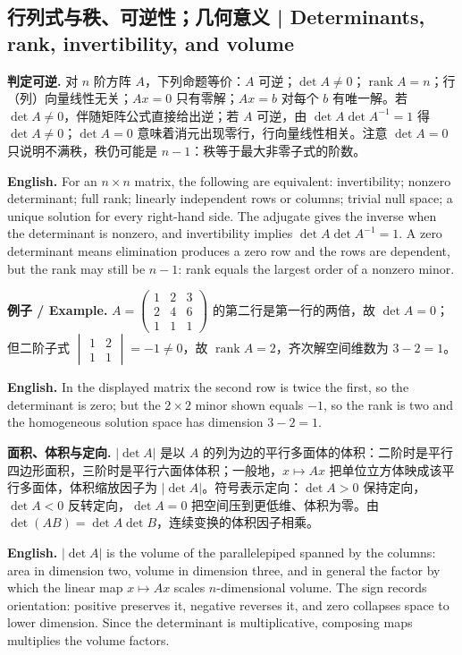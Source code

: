 \documentclass[UTF8,11pt,a4paper]{ctexart}
\newcommand{\EN}[1]{\par\noindent\textbf{English.} #1\par}
\newcommand{\EX}[2]{\par\noindent\textbf{例子 / Example.} #1\par\EN{#2}}
\begin{document}
\subsection{行列式与秩、可逆性；几何意义 | Determinants, rank, invertibility, and volume}
\noindent\textbf{判定可逆.} 对 $n$ 阶方阵 $A$，下列命题等价：$A$ 可逆；$\det A\ne0$；$\operatorname{rank}A=n$；行（列）向量线性无关；$Ax=0$ 只有零解；$Ax=b$ 对每个 $b$ 有唯一解。若 $\det A\ne0$，伴随矩阵公式直接给出逆；若 $A$ 可逆，由 $\det A\det A^{-1}=1$ 得 $\det A\ne0$；$\det A=0$ 意味着消元出现零行，行向量线性相关。注意 $\det A=0$ 只说明不满秩，秩仍可能是 $n-1$：秩等于最大非零子式的阶数。
\EN{For an $n\times n$ matrix, the following are equivalent: invertibility; nonzero determinant; full rank; linearly independent rows or columns; trivial null space; a unique solution for every right-hand side. The adjugate gives the inverse when the determinant is nonzero, and invertibility implies $\det A\det A^{-1}=1$. A zero determinant means elimination produces a zero row and the rows are dependent, but the rank may still be $n-1$: rank equals the largest order of a nonzero minor.}
\EX{$A=\begin{pmatrix}1&2&3\\2&4&6\\1&1&1\end{pmatrix}$ 的第二行是第一行的两倍，故 $\det A=0$；但二阶子式 $\begin{vmatrix}1&2\\1&1\end{vmatrix}=-1\ne0$，故 $\operatorname{rank}A=2$，齐次解空间维数为 $3-2=1$。}{In the displayed matrix the second row is twice the first, so the determinant is zero; but the $2\times2$ minor shown equals $-1$, so the rank is two and the homogeneous solution space has dimension $3-2=1$.}
\noindent\textbf{面积、体积与定向.} $|\det A|$ 是以 $A$ 的列为边的平行多面体的体积：二阶时是平行四边形面积，三阶时是平行六面体体积；一般地，$x\mapsto Ax$ 把单位立方体映成该平行多面体，体积缩放因子为 $|\det A|$。符号表示定向：$\det A>0$ 保持定向，$\det A<0$ 反转定向，$\det A=0$ 把空间压到更低维、体积为零。由 $\det(AB)=\det A\det B$，连续变换的体积因子相乘。
\EN{$|\det A|$ is the volume of the parallelepiped spanned by the columns: area in dimension two, volume in dimension three, and in general the factor by which the linear map $x\mapsto Ax$ scales $n$-dimensional volume. The sign records orientation: positive preserves it, negative reverses it, and zero collapses space to lower dimension. Since the determinant is multiplicative, composing maps multiplies the volume factors.}
\end{document}

